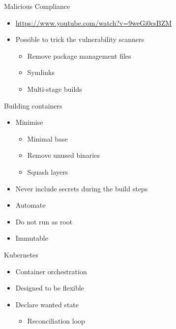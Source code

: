 \documentclass{dcpresentation}
\begin{document}

\begin{frame}{Malicious Compliance}
  \begin{itemize}
  \item \url{https://www.youtube.com/watch?v=9weGi0csBZM}
  \item Possible to trick the vulnerability scanners
  \begin{itemize}
  \item Remove package management files
  \item Symlinks
  \item Multi-stage builds
  \end{itemize} 
  \end{itemize}  
\end{frame}


\begin{frame}{Building containers}
 \begin{itemize}
  \item Minimise
  \begin{itemize}
   \item Minimal base %
   \item Remove unused binaries
   \item Squash layers %
  \end{itemize}
  \item Never include secrets during the build steps
  \item Automate
  \item Do not run as root
  \item Immutable
 \end{itemize}
\end{frame}


\begin{frame}{Kubernetes}
  \begin{itemize}
  \item Container orchestration
  \item Designed to be flexible
  \item Declare wanted state
    \begin{itemize}
    \item Reconciliation loop
    \end{itemize}
  \end{itemize}
\end{frame}
\end{document}
